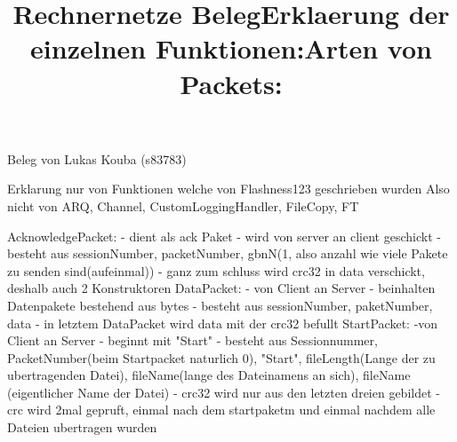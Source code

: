 \documentclass [12pt]{article}
\begin{document}
\title{Rechnernetze Beleg}
\maketitle
\begin{center}
Beleg von Lukas Kouba (s83783)
\end{center}
\title{Erklaerung der einzelnen Funktionen:}
\maketitle
\newline
Erklarung nur von Funktionen welche von Flashness123 geschrieben wurden\newline
Also nicht von ARQ, Channel, CustomLoggingHandler, FileCopy, FT
\newline

\title{Arten von Packets:}
\maketitle
\newline\newline
AcknowledgePacket:\newline
- dient als ack Paket\newline
- wird von server an client geschickt\newline
- besteht aus sessionNumber, packetNumber, gbnN(1, also anzahl wie viele Pakete zu senden sind(aufeinmal))\newline
- ganz zum schluss wird crc32 in data verschickt, deshalb auch 2 Konstruktoren\newline\newline
DataPacket:\newline
- von Client an Server \newline
- beinhalten Datenpakete bestehend aus bytes\newline
- besteht aus sessionNumber, paketNumber, data\newline
- in letztem DataPacket wird data mit der crc32 befullt\newline\newline
StartPacket:\newline
-von Client an Server\newline
- beginnt mit "Start"\newline
- besteht aus Sessionnummer, PacketNumber(beim Startpacket naturlich 0), "Start", fileLength(Lange der zu ubertragenden Datei),\newline
 fileName(lange des Dateinamens an sich), fileName (eigentlicher Name der Datei)\newline
- crc32 wird nur aus den letzten dreien gebildet\newline
- crc wird 2mal gepruft, einmal nach dem startpaketm und einmal nachdem alle Dateien ubertragen wurden\newline\newline
\end{document}
